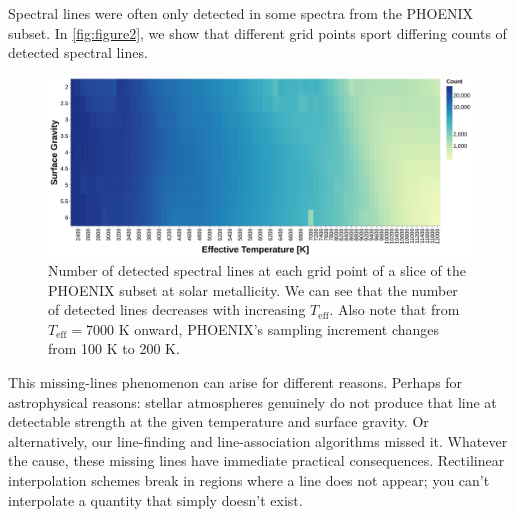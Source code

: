 \documentclass[twocolumn, linenumbers]{aastex631}
\begin{document}
Spectral lines were often only detected in some spectra from the PHOENIX subset.
In \autoref{fig:figure2}, we show that different grid points sport differing counts of detected spectral lines.
\begin{figure}
    \centering
    \includegraphics[width=\textwidth]{figure2}
    \caption{Number of detected spectral lines at each grid point of a slice of the PHOENIX subset at solar metallicity.
    We can see that the number of detected lines decreases with increasing $T_{\mathrm{eff}}$.
    Also note that from $T_{\mathrm{eff}} = 7000$ K onward, PHOENIX's sampling increment changes from 100 K to 200 K.}
    \label{fig:figure2}
\end{figure}

This missing-lines phenomenon can arise for different reasons.
Perhaps for astrophysical reasons: stellar atmospheres genuinely do not produce that line at detectable strength at the given temperature and surface gravity.
Or alternatively, our line-finding and line-association algorithms missed it.
Whatever the cause, these missing lines have immediate practical consequences.
Rectilinear interpolation schemes break in regions where a line does not appear; you can't interpolate a quantity that simply doesn't exist.
\end{document}
